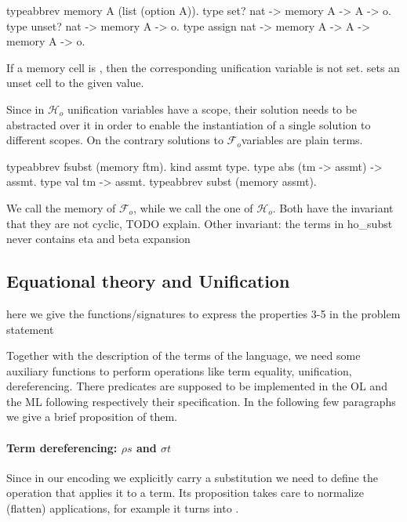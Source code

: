 \documentclass[sigconf,natbib=false,review]{acmart}
\newcommand{\Fo}{\ensuremath{\mathcal{F}_{\!o}\xspace}} %
\newcommand{\Ho}{\ensuremath{\mathcal{H}_o}\xspace}
\begin{document}
\begin{elpicode}
typeabbrev memory A (list (option A)).
type set?   nat -> memory A -> A -> o.
type unset? nat -> memory A -> o.
type assign nat -> memory A -> A -> memory A -> o.
\end{elpicode}

\noindent 
If a memory cell is , then the corresponding unification variable
is not set.  sets an unset cell to the given value.

Since in \Ho unification variables have a scope, their solution needs to be
abstracted over it in order to enable the instantiation of a single
solution to different scopes. On the contrary solutions to \Fo variables
are plain terms.

\begin{elpicode}
  typeabbrev fsubst (memory ftm).
  kind assmt type.
  type abs (tm -> assmt) -> assmt.
  type val tm -> assmt.
  typeabbrev subst (memory assmt).
\end{elpicode}

\noindent
We call  the memory of \Fo{}, while we call 
the one of \Ho.
Both have the invariant that they are not cyclic, TODO explain.
Other invariant: the terms in ho\_subst never contains eta and beta expansion

\subsection{Equational theory and Unification}

here we give the functions/signatures to express the properties 3-5 in the problem
statement

Together with the description of the terms of the language, we need some
auxiliary functions to perform operations like term equality, unification,
dereferencing. There predicates are supposed to be implemented in the OL and the
ML following respectively their specification. In the following few paragraphs
we give a brief proposition of them.

\paragraph{Term dereferencing: $\rho s$ and $\sigma t$}

Since in our encoding we explicitly carry a substitution we need to
define the operation that applies it to a term. Its proposition
takes care to normalize (flatten) applications, for example
it turns
into
.
\end{document}
